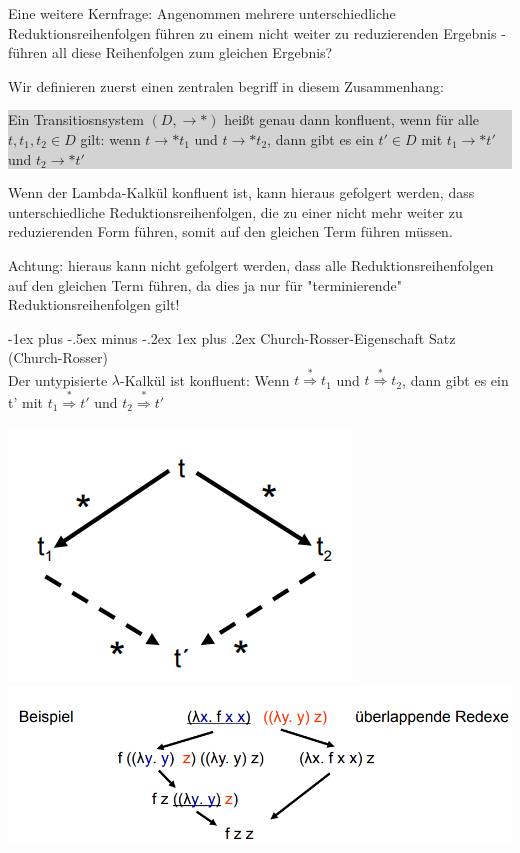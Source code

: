 \documentclass[10pt]{article}
\makeatletter
\renewcommand{\subsubsection}{\@startsection{subsubsection}{3}{0mm}%
                                {-1ex plus -.5ex minus -.2ex}%
                                {1ex plus .2ex}%
                                {\normalfont\small\bfseries}}
\makeatother
\begin{document}
\begin{itemize*}
\begin{itemize*}
  \end{itemize*}
  \item Eine weitere Kernfrage: Angenommen mehrere unterschiedliche Reduktionsreihenfolgen führen zu einem nicht weiter zu reduzierenden Ergebnis - \color{blue} führen all diese Reihenfolgen zum gleichen Ergebnis? \color{black}
  \item Wir definieren zuerst einen zentralen begriff in diesem Zusammenhang:
  \colorbox{lightgray}{\begin{minipage}[h]{1.0\linewidth}
      Ein Transitiosnsystem $(D,\rightarrow*)$ heißt genau dann konfluent, wenn für alle $t,t_1,t_2 \in D$ gilt: wenn  $ t \rightarrow* t_1$ und $t \rightarrow* t_2$, dann gibt es ein $t' \in D$ mit $t_1 \rightarrow* t'$ und $t_2 \rightarrow* t'$
    \end{minipage}}
  \item Wenn der Lambda-Kalkül konfluent ist, kann hieraus gefolgert werden, dass unterschiedliche Reduktionsreihenfolgen, die zu einer nicht mehr weiter zu reduzierenden Form führen, somit auf den gleichen Term führen müssen.
  \item Achtung: hieraus kann nicht gefolgert werden, dass alle Reduktionsreihenfolgen auf den gleichen Term führen, da dies ja nur für "terminierende" Reduktionsreihenfolgen gilt!
\end{itemize*}

\subsubsection{Church-Rosser-Eigenschaft}
\color{blue} Satz (Church-Rosser) \\
Der untypisierte $\lambda$-Kalkül ist konfluent: Wenn $t \stackrel{*}{\Rightarrow} t_1$ und $t \stackrel{*}{\Rightarrow} t_2$, dann gibt es ein t' mit $t_1 \stackrel{*}{\Rightarrow} t'$ und $t_2 \stackrel{*}{\Rightarrow} t'$
\color{black}

\begin{center}
  \includegraphics[width=0.25\linewidth]{Assets/Programmierparadigmen-diamant-eigenschaft.png}
  \includegraphics[width=0.25\linewidth]{Assets/Programmierparadigmen-diamant-beispiel}
\end{center}
\end{document}
